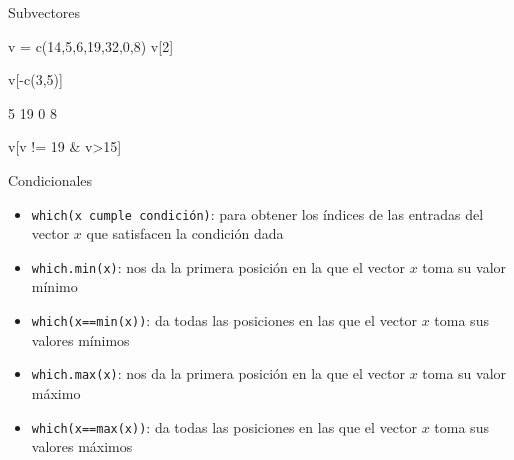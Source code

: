 \documentclass[
  ignorenonframetext,
  aspectratio=169]{beamer}
\newenvironment{Shaded}{\begin{snugshade}}{\end{snugshade}}
\newcommand{\DecValTok}[1]{\textcolor[rgb]{0.00,0.00,0.81}{#1}}
\newcommand{\FunctionTok}[1]{\textcolor[rgb]{0.00,0.00,0.00}{#1}}
\newcommand{\NormalTok}[1]{#1}
\newcommand{\OtherTok}[1]{\textcolor[rgb]{0.56,0.35,0.01}{#1}}
\newcommand{\SpecialCharTok}[1]{\textcolor[rgb]{0.00,0.00,0.00}{#1}}
\providecommand{\tightlist}{%
  \setlength{\itemsep}{0pt}\setlength{\parskip}{0pt}}
\let\oldverbatim\verbatim
\let\endoldverbatim\endverbatim
\renewenvironment{verbatim}{\tiny\oldverbatim}{\endoldverbatim}
\begin{document}
\begin{frame}[fragile]{Subvectores}
\protect\hypertarget{subvectores-2}{}
\begin{Shaded}
\begin{Highlighting}[]
\NormalTok{v }\OtherTok{=} \FunctionTok{c}\NormalTok{(}\DecValTok{14}\NormalTok{,}\DecValTok{5}\NormalTok{,}\DecValTok{6}\NormalTok{,}\DecValTok{19}\NormalTok{,}\DecValTok{32}\NormalTok{,}\DecValTok{0}\NormalTok{,}\DecValTok{8}\NormalTok{)}
\NormalTok{v[}\DecValTok{2}\NormalTok{]}
\end{Highlighting}
\end{Shaded}

\begin{verbatim}
[1] 5
\end{verbatim}

\begin{Shaded}
\begin{Highlighting}[]
\NormalTok{v[}\SpecialCharTok{{-}}\FunctionTok{c}\NormalTok{(}\DecValTok{3}\NormalTok{,}\DecValTok{5}\NormalTok{)]}
\end{Highlighting}
\end{Shaded}

\begin{verbatim}
[1] 14  5 19  0  8
\end{verbatim}

\begin{Shaded}
\begin{Highlighting}[]
\NormalTok{v[v }\SpecialCharTok{!=} \DecValTok{19} \SpecialCharTok{\&}\NormalTok{ v}\SpecialCharTok{\textgreater{}}\DecValTok{15}\NormalTok{]}
\end{Highlighting}
\end{Shaded}

\begin{verbatim}
[1] 32
\end{verbatim}
\end{frame}

\begin{frame}[fragile]{Condicionales}
\protect\hypertarget{condicionales}{}
\begin{itemize}
\tightlist
\item
  \texttt{which(x\ cumple\ condición)}: para obtener los índices de las
  entradas del vector \(x\) que satisfacen la condición dada
\item
  \texttt{which.min(x)}: nos da la primera posición en la que el vector
  \(x\) toma su valor mínimo
\item
  \texttt{which(x==min(x))}: da todas las posiciones en las que el
  vector \(x\) toma sus valores mínimos
\item
  \texttt{which.max(x)}: nos da la primera posición en la que el vector
  \(x\) toma su valor máximo
\item
  \texttt{which(x==max(x))}: da todas las posiciones en las que el
  vector \(x\) toma sus valores máximos
\end{itemize}
\end{frame}
\end{document}
